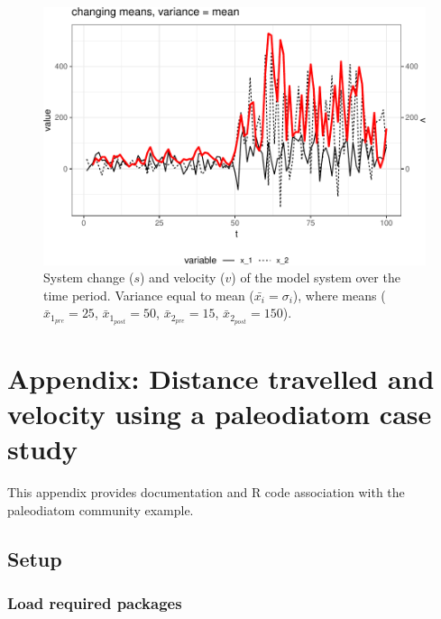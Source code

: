 \documentclass[12pt,twoside,openany]{reedthesis}
\begin{document}
\begin{figure}[h]

{\centering \includegraphics[width=0.95\linewidth]{_myDissertation_files/figure-latex/velocSysEx4-1} 

}

\caption{System change ($s$) and velocity ($v$) of the model system over the time period. Variance equal to mean ($\bar{x_i}=\sigma_i$), where means ($\bar{x}_{1_{pre}}=25$, $\bar{x}_{1_{post}}=50$, $\bar{x}_{2_{pre}}=15$, $\bar{x}_{2_{post}}=150$).}\label{fig:velocSysEx4}
\end{figure}
\appendix

\hypertarget{appPaleo}{%
\chapter*{Appendix: Distance travelled and velocity using a paleodiatom case study}\label{appPaleo}}

This appendix provides documentation and R code association with the paleodiatom community example.

\hypertarget{setup}{%
\section{Setup}\label{setup}}

\hypertarget{load-required-packages}{%
\subsection{Load required packages}\label{load-required-packages}}
\end{document}
